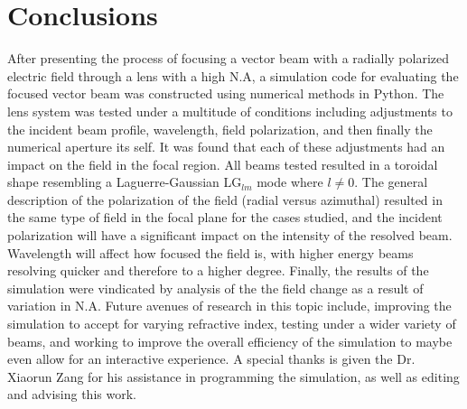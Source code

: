 \documentclass[12pt,a4paper]{article}
\begin{document}
\section{Conclusions}
After presenting the process of focusing a vector beam with a radially polarized electric field through a lens with a high N.A, a simulation code for evaluating the focused vector beam was constructed using numerical methods in Python. The lens system was tested under a multitude of conditions including adjustments to the incident beam profile, wavelength, field polarization, and then finally the numerical aperture its self. It was found that each of these adjustments had an impact on the field in the focal region. All beams tested resulted in a toroidal shape resembling a Laguerre-Gaussian LG$_{lm}$ mode where $l\neq 0$. The general description of the polarization of the field (radial versus azimuthal) resulted in the same type of field in the focal plane for the cases studied, and the incident polarization will have a significant impact on the intensity of the resolved beam. Wavelength will affect how focused the field is, with higher energy beams resolving quicker and therefore to a higher degree. Finally, the results of the simulation were vindicated by analysis of the the field change as a result of variation in N.A. Future avenues of research in this topic include, improving the simulation to accept for varying refractive index, testing under a wider variety of beams, and working to improve the overall efficiency of the simulation to maybe even allow for an interactive experience. A special thanks is given the Dr. Xiaorun Zang for his assistance in programming the simulation, as well as editing and advising this work. 

\clearpage
{}

\renewcommand{\bibname}{References}
%
%
\renewcommand{\baselinestretch}{1}

\end{document}
